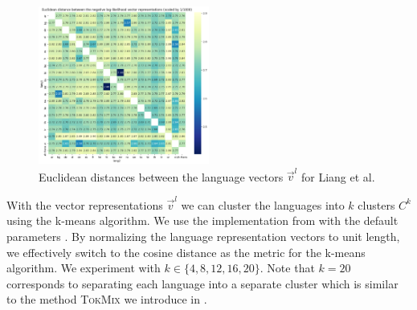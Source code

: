 \begin{figure}[h]
    \centering
    \includegraphics[width=0.5\textwidth]{img/liang_euclid_distances.png}
    \caption{Euclidean distances between the language vectors $\vec{v}^l$ for Liang et al.}
    \label{fig:liang_euclid_distances}
\end{figure}


With the vector representations $\vec{v}^l$ we can cluster the languages into $k$ clusters $C^k$ using the k-means algorithm. We use the implementation from \cite{scikit-learn} with the default parameters . By normalizing the language representation vectors to unit length, we effectively switch to the cosine distance as the metric for the k-means algorithm. We experiment with $k \in \{4, 8, 12, 16, 20\}$. Note that $k=20$ corresponds to separating each language into a separate cluster which is similar to the method \textsc{TokMix} we introduce in \citet{limisiewicz_tokenization_2023}. 

